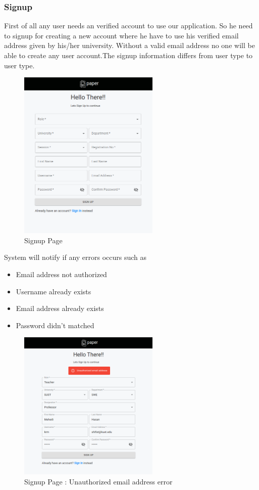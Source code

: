 \documentclass[10pt]{article}
\begin{document}
\subsubsection{Signup} First of all any user needs an verified account to use our application. So he need to signup for creating a new account where he have to use his verified email address given by his/her university. Without a valid email address no one will be able to create any user account.The signup information differs from user type to user type.

\begin{figure}[H]
  \centering
  \centerline{\includegraphics[width=0.6\textwidth]{signup/signup.png}}
  \caption{Signup Page}
  \label{fig}
\end{figure}

System will notify if any errors occurs such as

\begin{itemize}
  \item Email address not authorized
  \item Username already exists
  \item Email address already exists
  \item Password didn't matched
\end{itemize}

\begin{figure}[H]
  \centering
  \centerline{\includegraphics[width=0.6\textwidth]{signup/signup-error-e.png}}
  \caption{Signup Page : Unauthorized email address error}
  \label{fig}
\end{figure}
\end{document}
